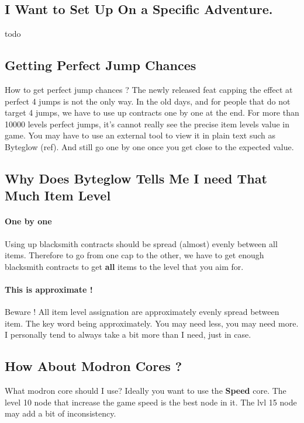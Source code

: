 \documentclass{article}
\begin{document}
\subsection{I Want to Set Up On a Specific Adventure.}

todo

\subsection{Getting Perfect Jump Chances}
\label{sec:upgradeIlvl}

How to get perfect jump chances ?
The newly released feat capping the effect at perfect 4 jumps is not the only way.
In the old days, and for people that do not target 4 jumps, we have to use up contracts one by one at the end.
For more than 10000 levels perfect jumps, it's cannot really see the precise item levels value in game.
You may have to use an external tool to view it in plain text such as Byteglow (ref).
And still go one by one once you get close to the expected value.

\subsection{Why Does Byteglow Tells Me I need That Much Item Level}

\paragraph{One by one}

Using up blacksmith contracts should be spread (almost) evenly between all items.
Therefore to go from one cap to the other, we have to get enough blacksmith contracts to get \textbf{all} items to the level that you aim for.

\paragraph{This is approximate !}
Beware !
All item level assignation are approximately evenly spread between item.
The key word being approximately.
You may need less, you may need more.
I personally tend to always take a bit more than I need, just in case.

\subsection{How About Modron Cores ?}

What modron core should I use?
Ideally you want to use the \textbf{Speed} core.
The level 10 node that increase the game speed is the best node in it.
The lvl 15 node may add a bit of inconsistency.
\end{document}

